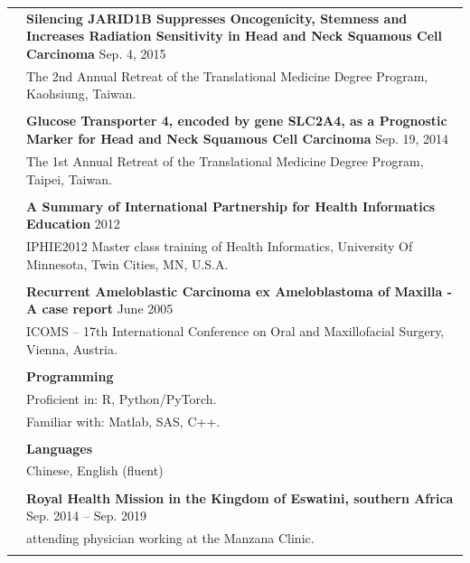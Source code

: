 \begin{longtable}{p{1.3in}p{4.8in}}
& \textbf{Silencing JARID1B Suppresses
Oncogenicity, Stemness and Increases Radiation Sensitivity in Head and
Neck Squamous Cell Carcinoma} \hfill Sep. 4, 2015 \\
& The 2nd Annual Retreat of the
Translational Medicine Degree Program, Kaohsiung, Taiwan. \\
& \\


& \textbf{Glucose Transporter 4, encoded by gene
SLC2A4, as a Prognostic Marker for Head and Neck Squamous Cell
Carcinoma} \hfill Sep. 19, 2014 \\
& The 1st Annual Retreat of the Translational Medicine Degree Program, Taipei, Taiwan. \\
& \\


& \textbf{A Summary of International Partnership for Health Informatics Education} \hfill  2012 \\
& IPHIE2012 Master
class training of Health Informatics, University Of Minnesota, Twin
Cities, MN, U.S.A. \\
& \\

& \textbf{Recurrent Ameloblastic Carcinoma ex
Ameloblastoma of Maxilla - A case report} \hfill June 2005 \\
& ICOMS – 17th International
Conference on Oral and Maxillofacial Surgery, Vienna, Austria. \\
& \\




{\color{OliveGreen}{Skills}} 
& \textbf{Programming}\\
& Proficient in: R, Python/PyTorch. \\
& Familiar with: Matlab, SAS, C++. \\
& \\

& \textbf{Languages} \\
& Chinese, English (fluent) \\
& \\


\color{OliveGreen}{Service and outreach by TMU} %
& \textbf{Royal Health Mission in the Kingdom of Eswatini, southern Africa} \hfill Sep. 2014 -- Sep. 2019 \\
& attending physician working at the Manzana Clinic. \\
& \\


\end{longtable}
